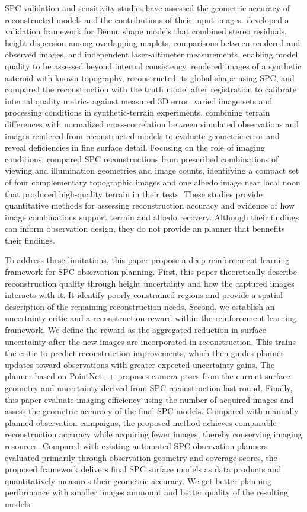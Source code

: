 SPC validation and sensitivity studies have assessed the geometric accuracy of reconstructed models and the contributions of their input images. \citet{alasad2021} developed a validation framework for Bennu shape models that combined stereo residuals, height dispersion among overlapping maplets, comparisons between rendered and observed images, and independent laser-altimeter measurements, enabling model quality to be assessed beyond internal consistency. \citet{weirich2022} rendered images of a synthetic asteroid with known topography, reconstructed its global shape using SPC, and compared the reconstruction with the truth model after registration to calibrate internal quality metrics against measured 3D error. \citet{palmer2024accuracy} varied image sets and processing conditions in synthetic-terrain experiments, combining terrain differences with normalized cross-correlation between simulated observations and images rendered from reconstructed models to evaluate geometric error and reveal deficiencies in fine surface detail. Focusing on the role of imaging conditions, \citet{palmer2024geometry} compared SPC reconstructions from prescribed combinations of viewing and illumination geometries and image counts, identifying a compact set of four complementary topographic images and one albedo image near local noon that produced high-quality terrain in their tests. These studies provide quantitative methods for assessing reconstruction accuracy and evidence of how image combinations support terrain and albedo recovery. Although their findings can inform observation design, they do not provide an planner that bennefits their findings.

To address these limitations, this paper propose a deep reinforcement learning framework for SPC observation planning. First, this paper theoretically describe reconstruction quality through height uncertainty and how the captured images interacts with it. It identify poorly constrained regions and provide a spatial description of the remaining reconstruction needs. Second, we establish an uncertainty critic and a reconstruction reward within the reinforcement learning framework. We define the reward as the aggregated reduction in surface uncertainty after the new images are incorporated in reconstruction. This trains the critic to predict reconstruction improvements, which then guides planner updates toward observations with greater expected uncertainty gains. The planner based on PointNet++ proposes camera poses from the current surface geometry and uncertainty derived from SPC reconstruction last round. Finally, this paper evaluate imaging efficiency using the number of acquired images and assess the geometric accuracy of the final SPC models. Compared with manually planned observation campaigns, the proposed method achieves comparable reconstruction accuracy while acquiring fewer images, thereby conserving imaging resources. Compared with existing automated SPC observation planners evaluated primarily through observation geometry and coverage scores, the proposed framework delivers final SPC surface models as data products and quantitatively measures their geometric accuracy. We get better planning performance with smaller images ammount and better quality of the resulting models.

